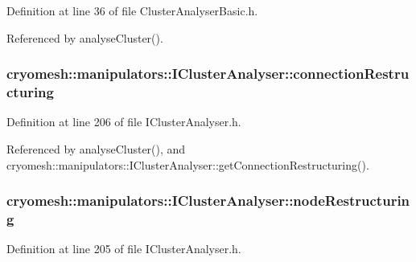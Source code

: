 \-Definition at line 36 of file \-Cluster\-Analyser\-Basic.\-h.



\-Referenced by analyse\-Cluster().

\hypertarget{classcryomesh_1_1manipulators_1_1IClusterAnalyser_ae0442c245ec17e22d51ffd05c3a2f86e}{
\subsubsection[{connection\-Restructuring}]{ {\bf cryomesh\-::manipulators\-::\-I\-Cluster\-Analyser\-::connection\-Restructuring}}}\label{classcryomesh_1_1manipulators_1_1IClusterAnalyser_ae0442c245ec17e22d51ffd05c3a2f86e}


\-Definition at line 206 of file \-I\-Cluster\-Analyser.\-h.



\-Referenced by analyse\-Cluster(), and cryomesh\-::manipulators\-::\-I\-Cluster\-Analyser\-::get\-Connection\-Restructuring().

\hypertarget{classcryomesh_1_1manipulators_1_1IClusterAnalyser_a78d90b9829e4188ded3d94da49c6887a}{
\subsubsection[{node\-Restructuring}]{ {\bf cryomesh\-::manipulators\-::\-I\-Cluster\-Analyser\-::node\-Restructuring}}}\label{classcryomesh_1_1manipulators_1_1IClusterAnalyser_a78d90b9829e4188ded3d94da49c6887a}


\-Definition at line 205 of file \-I\-Cluster\-Analyser.\-h.



